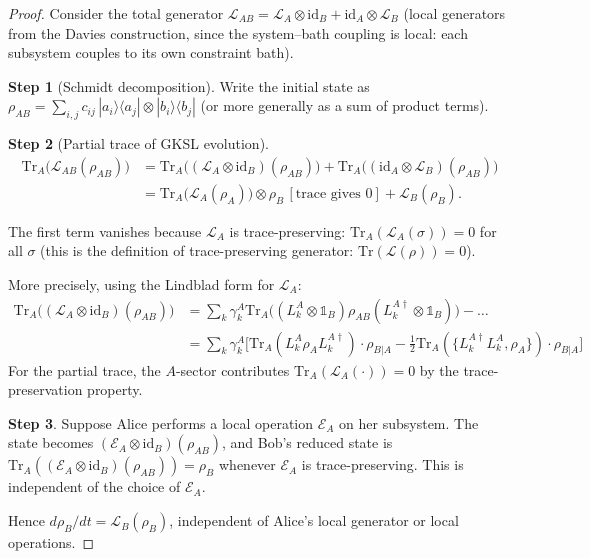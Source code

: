 \begin{proof}
Consider the total generator $\mathcal{L}_{AB} = \mathcal{L}_A \otimes
\mathrm{id}_B + \mathrm{id}_A \otimes \mathcal{L}_B$ (local generators
from the Davies construction, since the system--bath coupling is local:
each subsystem couples to its own constraint bath).

\textbf{Step 1} (Schmidt decomposition).  Write the initial state as
$\rho_{AB} = \sum_{i,j} c_{ij}\, |a_i\rangle\langle a_j| \otimes
|b_i\rangle\langle b_j|$ (or more generally as a sum of product terms).

\textbf{Step 2} (Partial trace of GKSL evolution).
\begin{align}
  \mathrm{Tr}_A\bigl(\mathcal{L}_{AB}(\rho_{AB})\bigr)
  &= \mathrm{Tr}_A\bigl(
      (\mathcal{L}_A \otimes \mathrm{id}_B)(\rho_{AB})
    \bigr)
    + \mathrm{Tr}_A\bigl(
      (\mathrm{id}_A \otimes \mathcal{L}_B)(\rho_{AB})
    \bigr) \nonumber\\
  &= \mathrm{Tr}_A\bigl(
      \mathcal{L}_A(\rho_A)\bigr) \otimes \rho_B\, [\text{trace gives 0}]
    + \mathcal{L}_B(\rho_B).
  \label{eq:c9:nosignal_proof}
\end{align}

The first term vanishes because $\mathcal{L}_A$ is trace-preserving:
$\mathrm{Tr}_A(\mathcal{L}_A(\sigma)) = 0$ for all $\sigma$
(this is the definition of trace-preserving generator:
$\mathrm{Tr}(\mathcal{L}(\rho)) = 0$).

More precisely, using the Lindblad form for $\mathcal{L}_A$:
\begin{align}
  \mathrm{Tr}_A\bigl((\mathcal{L}_A \otimes \mathrm{id}_B)(\rho_{AB})\bigr)
  &= \sum_k \gamma_k^A \mathrm{Tr}_A\bigl(
    (L_k^A \otimes \mathbb{1}_B) \rho_{AB} (L_k^{A\dagger} \otimes \mathbb{1}_B)
  \bigr) - \ldots \nonumber\\
  &= \sum_k \gamma_k^A \bigl[
    \mathrm{Tr}_A(L_k^A \rho_A L_k^{A\dagger}) \cdot \rho_{B|A}
    - \tfrac{1}{2}\mathrm{Tr}_A(\{L_k^{A\dagger}L_k^A, \rho_A\}) \cdot \rho_{B|A}
  \bigr]
\end{align}
For the partial trace, the $A$-sector contributes $\mathrm{Tr}_A(\mathcal{L}_A(\cdot)) = 0$
by the trace-preservation property.

\textbf{Step 3}.  Suppose Alice performs a local operation
$\mathcal{E}_A$ on her subsystem.  The state becomes
$(\mathcal{E}_A \otimes \mathrm{id}_B)(\rho_{AB})$, and Bob's
reduced state is $\mathrm{Tr}_A((\mathcal{E}_A \otimes \mathrm{id}_B)(\rho_{AB}))
= \rho_B$ whenever $\mathcal{E}_A$ is trace-preserving.  This is
independent of the choice of $\mathcal{E}_A$.

Hence $d\rho_B/dt = \mathcal{L}_B(\rho_B)$, independent of Alice's
local generator or local operations.
\end{proof}

